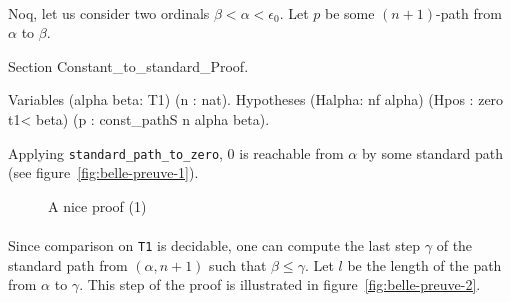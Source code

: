 \documentclass[a4paper]{book}
\begin{document}
\paragraph*{}
Noq, let us consider two ordinals  $\beta<\alpha<\epsilon_0$.  Let $p$  be some $(n+1)$-path from $\alpha$ to $\beta$.

\begin{Coqsrc}
 Section Constant_to_standard_Proof.

  Variables (alpha beta: T1) (n : nat).
  Hypotheses (Halpha: nf alpha) (Hpos : zero t1<  beta)
             (p : const_pathS n alpha  beta).
\end{Coqsrc}

Applying \texttt{standard\_path\_to\_zero}, $0$ is reachable from $\alpha$ by some standard path  (see figure~\vref{fig:belle-preuve-1}).

\begin{figure}[h]
  \centering
 
\caption{A nice proof (1)}
  \label{fig:belle-preuve-1}
\end{figure}


\paragraph*{}




Since comparison on \texttt{T1} is decidable, one can compute the last step $\gamma$ of the standard path from $(\alpha,n+1)$  such that $\beta\leq \gamma$.
Let $l$ be the length of the path from $\alpha$ to $\gamma$.  
This step of the proof is illustrated in figure~\vref{fig:belle-preuve-2}.
\end{document}
